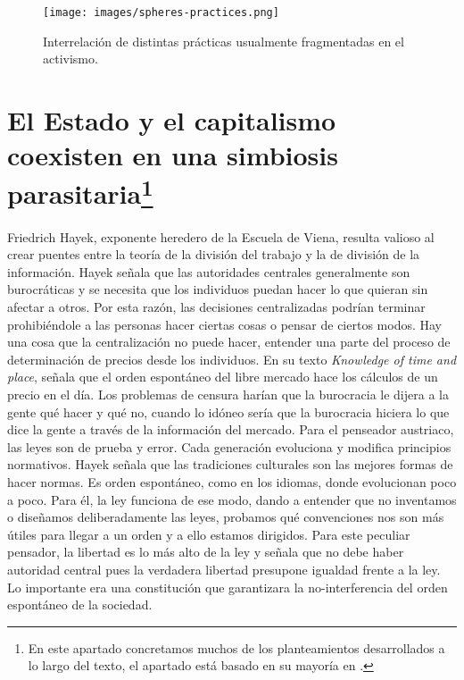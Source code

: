 \begin{figure}[htb]
  \centering
  \texttt{[image: images/spheres-practices.png]}
  \caption{Interrelación de distintas prácticas usualmente fragmentadas en el activismo.}
  \label{fig:spehres}
\end{figure}

\section[El Estado y el capitalismo coexisten en una simbiosis parasitaria]{El Estado y el capitalismo coexisten en una simbiosis parasitaria\footnote{En este apartado concretamos muchos de los planteamientos desarrollados a lo largo del texto, el apartado está basado en su mayoría en \autocite{PeopleArePeople2018}.}}
\label{sub:el-estado-y-el-capitalismo-coexisten-en-una-simbiosis-parasitaria}

Friedrich Hayek, exponente heredero de la Escuela de Viena, resulta valioso al crear puentes entre la teoría de la división del trabajo y la de división de la información. Hayek señala que las autoridades centrales generalmente son burocráticas y se necesita que los individuos puedan hacer lo que quieran sin afectar a otros. Por esta razón, las decisiones centralizadas podrían terminar prohibiéndole a las personas hacer ciertas cosas o pensar de ciertos modos. Hay una cosa que la centralización no puede hacer, entender una parte del proceso de determinación de precios desde los individuos. En su texto \emph{Knowledge of time and place}, señala que el orden espontáneo del libre mercado hace los cálculos de un precio en el día. Los problemas de censura harían que la burocracia le dijera a la gente qué hacer y qué no, cuando lo idóneo sería que la burocracia hiciera lo que dice la gente a través de la información del mercado. Para el penseador austriaco, las leyes son de prueba y error. Cada generación evoluciona y modifica principios normativos. Hayek señala que las tradiciones culturales son las mejores formas de hacer normas. Es orden espontáneo, como en los idiomas, donde evolucionan poco a poco. Para él, la ley funciona de ese modo, dando a entender que no inventamos o diseñamos deliberadamente las leyes, probamos qué convenciones nos son más útiles para llegar a un orden y a ello estamos dirigidos. Para este peculiar pensador, la libertad es lo más alto de la ley y señala que no debe haber autoridad central pues la verdadera libertad presupone igualdad frente a la ley. Lo importante era una constitución que garantizara la no-interferencia del orden espontáneo de la sociedad.

